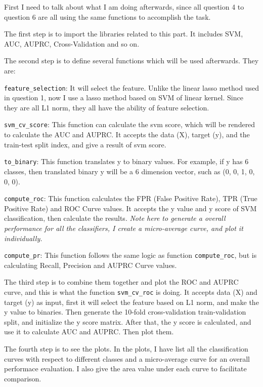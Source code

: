 \documentclass{article}
\begin{document}
    First I need to talk about what I am doing afterwards, since all
question 4 to question 6 are all using the same functions to accomplish
the task.

The first step is to import the libraries related to this part. It
includes SVM, AUC, AUPRC, Cross-Validation and so on.

The second step is to define several functions which will be used
afterwards. They are:

\texttt{feature\_selection}: It will select the feature. Unlike the
linear lasso method used in question 1, now I use a lasso method based
on SVM of linear kernel. Since they are all L1 norm, they all have the
ability of feature selection.

\texttt{svm\_cv\_score}: This function can calculate the svm score,
which will be rendered to calculate the AUC and AUPRC. It accepts the
data (X), target (y), and the train-test split index, and give a result
of svm score.

\texttt{to\_binary}: This function translates y to binary values. For
example, if y has 6 classes, then translated binary y will be a 6
dimension vector, such as (0, 0, 1, 0, 0, 0).

\texttt{compute\_roc}: This function calculates the FPR (False Positive
Rate), TPR (True Positive Rate) and ROC Curve values. It accepts the y
value and y score of SVM classification, then calculate the results.
\emph{Note here to generate a overall performance for all the
classifiers, I create a micro-average curve, and plot it individually.}

\texttt{compute\_pr}: This function follows the same logic as function
\texttt{compute\_roc}, but is calculating Recall, Precision and AUPRC
Curve values.

The third step is to combine them together and plot the ROC and AUPRC
curve, and this is what the function \texttt{svm\_cv\_roc} is doing. It
accepts data (X) and target (y) as input, first it will select the
feature based on L1 norm, and make the y value to binaries. Then
generate the 10-fold cross-validation train-validation split, and
initialize the y score matrix. After that, the y score is calculated,
and use it to calculate AUC and AUPRC. Then plot them.

The fourth step is to see the plots. In the plots, I have list all the
classification curves with respect to different classes and a
micro-average curve for an overall performace evaluation. I also give
the area value under each curve to facilitate comparison.
\end{document}
